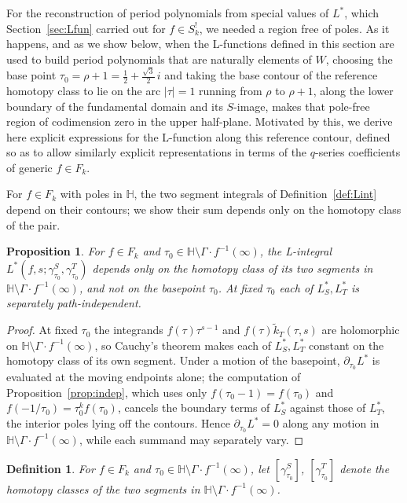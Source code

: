 \documentclass[11pt]{article}
\newtheorem{proposition}[theorem]{Proposition}
\newtheorem{definition}[theorem]{Definition}
\newcommand{\HH}{\mathbb{H}}
\newcommand{\tk}{\widetilde{k}_T}
\begin{document}
For the reconstruction of period polynomials from special values of $L^*$, which
Section~\ref{sec:Lfun} carried out for $f\in S^!_k$, we needed a region free of poles. As it
happens, and as we show below, when the L-functions defined in this
section are used to build period polynomials that are naturally elements of $W$, choosing the base
point $\tau_0=\rho+1=\tfrac{1}{2}+\tfrac{\sqrt3}{2}\,i$ and taking the base contour of the
reference homotopy class to lie on the arc $|\tau|=1$ running from $\rho$ to $\rho+1$, along the
lower boundary of the fundamental domain and its $S$-image, makes that pole-free region of
codimension zero in the upper half-plane. Motivated by this, we derive here explicit expressions
for the L-function along this reference contour, defined so as to allow similarly explicit
representations in terms of the $q$-series coefficients of generic $f\in F_k$.

For $f\in F_k$ with poles in $\HH$, the two segment integrals of Definition~\ref{def:Lint} depend
on their contours; we show their sum depends only on the homotopy class of the pair.

\begin{proposition}\label{prop:indepHomotopy_arc}
For $f\in F_k$ and $\tau_0\in\HH\setminus\Gamma\!\cdot\!f^{-1}(\infty)$, the L-integral
$L^*(f,s;\gamma^S_{\tau_0},\gamma^T_{\tau_0})$ depends only on the homotopy class of its
two segments in $\HH\setminus\Gamma\!\cdot\!f^{-1}(\infty)$, and not on the basepoint
$\tau_0$. At fixed $\tau_0$ each of $L^*_S,L^*_T$ is separately path-independent.
\end{proposition}

\begin{proof}
At fixed $\tau_0$ the integrands $f(\tau)\tau^{s-1}$ and $f(\tau)\tk(\tau,s)$ are
holomorphic on $\HH\setminus\Gamma\!\cdot\!f^{-1}(\infty)$, so Cauchy's theorem makes each
of $L^*_S,L^*_T$ constant on the homotopy class of its own segment. Under a motion of the
basepoint, $\partial_{\tau_0}L^*$ is evaluated at the moving endpoints alone; the
computation of Proposition~\ref{prop:indep}, which uses only $f(\tau_0-1)=f(\tau_0)$ and
$f(-1/\tau_0)=\tau_0^{k}f(\tau_0)$, cancels the boundary terms of $L^*_S$ against those
of $L^*_T$, the interior poles lying off the contours. Hence $\partial_{\tau_0}L^*=0$ along
any motion in $\HH\setminus\Gamma\!\cdot\!f^{-1}(\infty)$, while each summand may
separately vary.
\end{proof}

\begin{definition}\label{def:class_arc}
For $f\in F_k$ and $\tau_0\in\HH\setminus\Gamma\!\cdot\!f^{-1}(\infty)$, let
$[\gamma^S_{\tau_0}]$, $[\gamma^T_{\tau_0}]$ denote the homotopy classes of the two
segments in $\HH\setminus\Gamma\!\cdot\!f^{-1}(\infty)$.
\end{definition}
\end{document}
